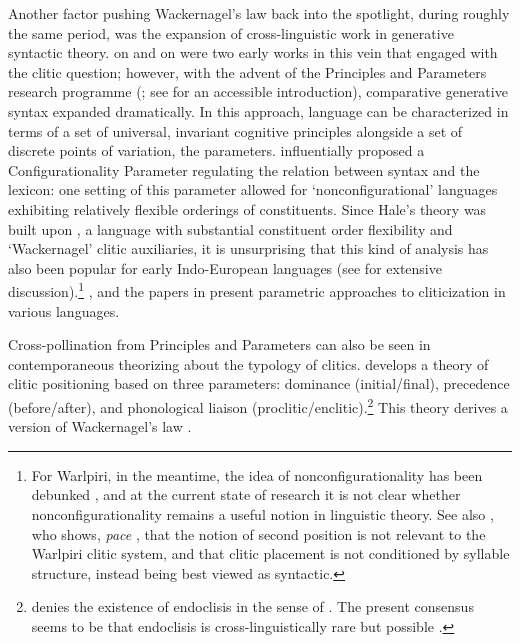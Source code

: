 Another factor pushing Wackernagel's law back into the spotlight, during roughly the same period, was the expansion of cross-linguistic work in generative syntactic theory. \citet{Hale1973} on  and \citet{Kayne1975} on  were two early works in this vein that engaged with the clitic question; however, with the advent of the Principles and Parameters research programme (\citealp{Chomsky1981,Chomsky1982,Borer1981,Rizzi1982}; see \citealp{Roberts1997} for an accessible introduction), comparative generative syntax expanded dramatically. In this approach, language can be characterized in terms of a set of universal, invariant cognitive principles alongside a set of discrete points of variation, the parameters. \citet{Hale1983} influentially proposed a Configurationality Parameter regulating the relation between syntax and the lexicon: one setting of this parameter allowed for `nonconfigurational' languages exhibiting relatively flexible orderings of constituents. Since Hale's theory was built upon , a language with substantial constituent order flexibility and `Wackernagel' clitic auxiliaries, it is unsurprising that this kind of analysis has also been popular for early Indo-European languages (see \citealp{Ledgeway2012} for extensive discussion).\footnote{For Warlpiri, in the meantime, the idea of nonconfigurationality has been debunked \citep{Legate2002}, and at the current state of research it is not clear whether nonconfigurationality remains a useful notion in linguistic theory. See also \citet{Legate2008}, who shows, \textit{pace} \citeauthor{Hale1973}, that the notion of second position is not relevant to the Warlpiri clitic system, and that clitic placement is not conditioned by syllable structure, instead being best viewed as syntactic.} \citet{Borer1981}, \citet{Rivero1986} and the papers in \citet{Borer1986} present parametric approaches to cliticization in various languages.

Cross-pollination from Principles and Parameters can also be seen in contemporaneous theorizing about the typology of clitics. \citet{Klavans1985} develops a theory of clitic positioning based on three parameters: dominance (initial/final), precedence (before/after), and phonological liaison (proclitic/enclitic).\footnote{\citet{Klavans1979,Klavans1985} denies the existence of endoclisis in the sense of \citet{Zwicky1977}. The present consensus seems to be that endoclisis is cross-linguistically rare but possible \citep{Harris2002,Smith2013}.} This theory derives a version of Wackernagel's law \citep[117]{Klavans1985}.

